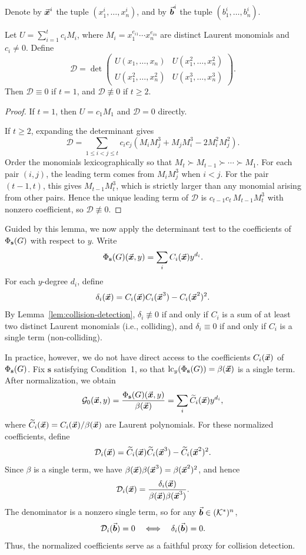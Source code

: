 \documentclass{article}
\numberwithin{equation}{section}
\begin{document}
Denote by $\vec{\boldsymbol{x}}^i$ the tuple $(x_1^i,\dots,x_n^i)$, and by $\vec{\boldsymbol{b}}^i$ the tuple $(b_1^i,\dots,b_n^i)$.

\begin{lemma}\label{lem:collision-detection}
Let $U = \sum_{i=1}^t c_i M_i$, where $M_i = x_1^{e_{i1}} \cdots x_n^{e_{in}}$ are distinct Laurent monomials and $c_i \neq 0$. Define
\[
\mathcal{D} = \det \begin{pmatrix}
U(x_1, \dots, x_n) & U(x_1^2, \dots, x_n^2) \\
U(x_1^2, \dots, x_n^2) & U(x_1^3, \dots, x_n^3)
\end{pmatrix}.
\]
Then $\mathcal{D} \equiv 0$ if $t = 1$, and $\mathcal{D} \not\equiv 0$ if $t \ge 2$.
\end{lemma}

\begin{proof}
If $t = 1$, then $U = c_1 M_1$ and $\mathcal{D} = 0$ directly.

If $t \ge 2$, expanding the determinant gives
\[
\mathcal{D} = \sum_{1 \le i < j \le t} c_i c_j \left( M_i M_j^3 + M_j M_i^3 - 2 M_i^2 M_j^2 \right).
\]
Order the monomials lexicographically so that $M_t \succ M_{t-1} \succ \cdots \succ M_1$. For each pair $(i,j)$, the leading term comes from $M_i M_j^3$ when $i<j$. For the pair $(t-1,t)$, this gives $M_{t-1} M_t^3$, which is strictly larger than any monomial arising from other pairs. Hence the unique leading term of $\mathcal{D}$ is $c_{t-1} c_t \, M_{t-1} M_t^3$ with nonzero coefficient, so $\mathcal{D} \not\equiv 0$.
\end{proof}

Guided by this lemma, we now apply the determinant test to the coefficients of $\Phi_{\mathbf{s}}(G)$ with respect to $y$. Write
\[
\Phi_{\mathbf{s}}(G)(\vec{\boldsymbol{x}}, y) = \sum_i C_i(\vec{\boldsymbol{x}}) y^{d_i}.
\]
For each $y$-degree $d_i$, define
\[
\delta_i(\vec{\boldsymbol{x}}) = C_i(\vec{\boldsymbol{x}}) C_i(\vec{\boldsymbol{x}}^3) - C_i(\vec{\boldsymbol{x}}^2)^2.
\]
By Lemma~\ref{lem:collision-detection}, $\delta_i \not\equiv 0$ if and only if $C_i$ is a sum of at least two distinct Laurent monomials (i.e., colliding), and $\delta_i \equiv 0$ if and only if $C_i$ is a single term (non-colliding).

In practice, however, we do not have direct access to the coefficients $C_i(\vec{\boldsymbol{x}})$ of $\Phi_{\mathbf{s}}(G)$. Fix $\mathbf{s}$ satisfying Condition~1, so that $\operatorname{lc}_y(\Phi_{\mathbf{s}}(G)) = \beta(\vec{\boldsymbol{x}})$ is a single term. After normalization, we obtain
\[
\mathcal{G}_0(\vec{\boldsymbol{x}}, y) = \frac{\Phi_{\mathbf{s}}(G)(\vec{\boldsymbol{x}}, y)}{\beta(\vec{\boldsymbol{x}})}
= \sum_i \widetilde{C}_i(\vec{\boldsymbol{x}}) y^{d_i},
\]
where $\widetilde{C}_i(\vec{\boldsymbol{x}}) = C_i(\vec{\boldsymbol{x}}) / \beta(\vec{\boldsymbol{x}})$ are Laurent polynomials. For these normalized coefficients, define
\[
\mathcal{D}_i(\vec{\boldsymbol{x}}) = \widetilde{C}_i(\vec{\boldsymbol{x}}) \widetilde{C}_i(\vec{\boldsymbol{x}}^3) - \widetilde{C}_i(\vec{\boldsymbol{x}}^2)^2.
\]
Since $\beta$ is a single term, we have $\beta(\vec{\boldsymbol{x}}) \beta(\vec{\boldsymbol{x}}^3) = \beta(\vec{\boldsymbol{x}}^2)^2$, and hence
\[
\mathcal{D}_i(\vec{\boldsymbol{x}}) = \frac{\delta_i(\vec{\boldsymbol{x}})}{\beta(\vec{\boldsymbol{x}}) \beta(\vec{\boldsymbol{x}}^3)}.
\]
The denominator is a nonzero single term, so for any $\vec{\boldsymbol{b}} \in ({\mathcal{K}}^*)^n$,
\[
\mathcal{D}_i(\vec{\boldsymbol{b}}) = 0 \quad \Longleftrightarrow \quad \delta_i(\vec{\boldsymbol{b}}) = 0.
\]
Thus, the normalized coefficients serve as a faithful proxy for collision detection.
\end{document}

